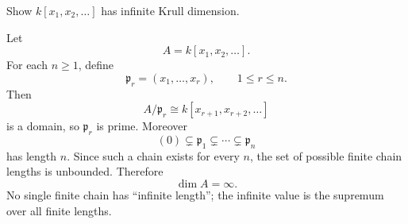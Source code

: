 \begin{problem}\label{prob:vi29-14}
Show \(k[x_1,x_2,\ldots]\) has infinite Krull dimension.

\end{problem}

\ifdefined\FullProblemDossiers
\begin{solution}
Let
\[
A=k[x_1,x_2,\ldots].
\]
For each \(n\ge1\), define
\[
\mathfrak p_r=(x_1,\ldots,x_r),\qquad 1\le r\le n.
\]
Then
\[
A/\mathfrak p_r\cong k[x_{r+1},x_{r+2},\ldots]
\]
is a domain, so \(\mathfrak p_r\) is prime.  Moreover
\[
(0)\subsetneq\mathfrak p_1\subsetneq\cdots\subsetneq\mathfrak p_n
\]
has length \(n\).  Since such a chain exists for every \(n\), the set of possible finite chain lengths is
unbounded.  Therefore
\[
\boxed{\dim A=\infty}.
\]
No single finite chain has ``infinite length''; the infinite value is the supremum over all finite lengths.
\end{solution}
\fi
